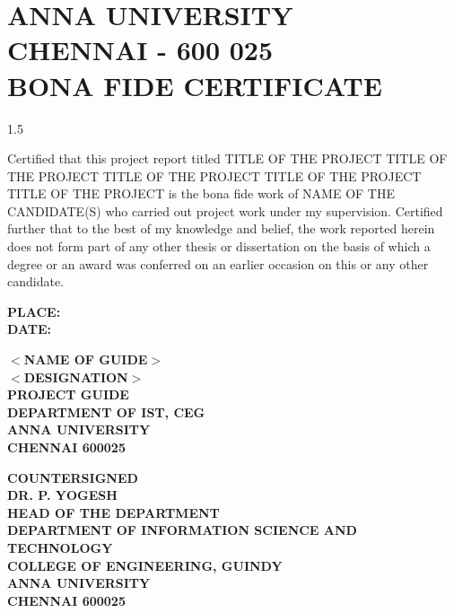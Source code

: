 \documentclass[13 pt,a4paper]{aureportm}
\begin{document}
\chapter*{ANNA UNIVERSITY\\
CHENNAI - 600 025\\
BONA FIDE CERTIFICATE}
\newlength{\aulength}
\settowidth{\aulength}{Anna University
  Chennai}
\newlength{\datewidth}
\settowidth{\datewidth}{Chennai 600 025}

\begin{spacing}{1.5}
  \begin{sloppypar}
  \fontsize{13}{14.5}\selectfont Certified that this project report titled TITLE OF THE PROJECT TITLE OF THE PROJECT TITLE OF THE PROJECT TITLE OF THE PROJECT TITLE OF THE PROJECT is the bona fide work of NAME OF THE CANDIDATE(S) who carried out project work under my supervision. Certified further that to the best of my knowledge and belief, the work reported herein does not form part of any other thesis or dissertation on the basis of which a degree or an award was conferred on an earlier occasion on this or any other candidate.
  \end{sloppypar}
\end{spacing}
\vspace{-0.3 cm}
\begin{flushleft}
 \parbox[t]{\datewidth}{\small{\textbf{PLACE: }}\\
 \small{\textbf{DATE: }}}
 \hfill
 \parbox[t]{6 cm}{\small{\textbf{$<$NAME OF GUIDE$>$}} \\
 \small{\textbf{$<$DESIGNATION$>$}}\\
 \small{\textbf{PROJECT GUIDE}}\\
 \small{\textbf{DEPARTMENT OF IST, CEG}}\\
 \small{\textbf{ANNA UNIVERSITY}}   \\
 \small{\textbf{CHENNAI  600025}}
 }
\end{flushleft}
\begin{center}
 \small{\textbf{COUNTERSIGNED}}\\ 
  \vspace{1.5 cm}
  \textbf{\small{DR. P. YOGESH}}\\
  \small{\textbf{HEAD OF THE DEPARTMENT}}\\
 \small{\textbf{DEPARTMENT OF INFORMATION SCIENCE AND TECHNOLOGY}}\\
 \small{\textbf{COLLEGE OF ENGINEERING, GUINDY}}\\
 \small{\textbf{ANNA UNIVERSITY}}   \\
 \small{\textbf{CHENNAI  600025}}
 
\end{center}
\end{document}
